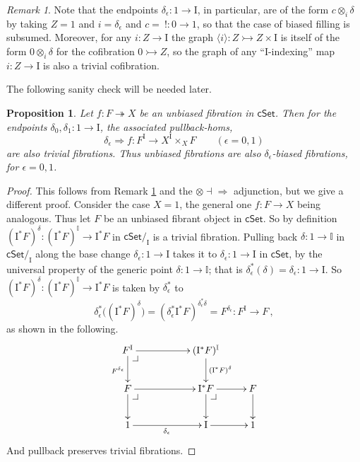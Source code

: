 \documentclass[11pt,reqno]{amsart}
\makeatletter
\newcommand{\cSet}{\ensuremath{\mathsf{cSet}}}
\newcommand{\mono}{\ensuremath{\rightarrowtail}}
\newcommand{\ra}{\ensuremath{\rightarrow}}
\newcommand{\cof}{\ensuremath{\rightarrowtail}}
\newcommand{\fib}{\ensuremath{\twoheadrightarrow}}
\renewcommand{\to}{\ensuremath{\rightarrow}}
\newcommand{\too}{\ensuremath{\longrightarrow}}
\newcommand{\gph}[1]{\ensuremath{\langle #1 \rangle}}
\newcommand{\I}{\ensuremath{\mathrm{I}}}
\newcommand{\II}{\ensuremath{\mathbb{I}}}
\newtheorem{proposition}[theorem]{Proposition}
\theoremstyle{remark}
\newtheorem{remark}[theorem]{Remark}
\theoremstyle{definition}
\newcommand{\pbcorner}[1][dr]{\save*!/#1-1.2pc/#1:(-1,1)@^{|-}\restore}
\makeatother
\begin{document}
\begin{remark}\label{rem:specialtrivcofs}
Note that the endpoints $\delta_\epsilon : 1 \ra \I$, in particular, are of the form $c \otimes_i\!\delta$ by taking $Z = 1$ and $i = \delta_\epsilon$ and $c =\ ! : 0 \ra 1$, so that the case of biased filling is subsumed.  Moreover, for any $i : Z\to \I$ the graph $\gph{i}: Z \mono Z\times \I$ is itself of the form $0 \otimes_i\!\delta$ for the cofibration $0 \cof Z$, so the graph of any ``$\I$-indexing'' map $i : Z\to\I$ is also a trivial cofibration.
\end{remark}

The following sanity check will be needed later.
\begin{proposition}\label{prop:sanitycheck}
Let $f:F\fib X$ be an unbiased fibration in $\cSet$. Then for the endpoints $\delta_0, \delta_1 : 1 \to \I$, the associated pullback-homs,
\begin{equation}\label{eq:unbiasedimpliesbiased}
\delta_\epsilon \Rightarrow f : F^\I \to X^\I \times_X F \qquad(\epsilon = 0,1)
\end{equation}
are also trivial fibrations. Thus unbiased fibrations are also $\delta_\epsilon$-biased fibrations, for $\epsilon=0,1$.
%
\end{proposition}

\begin{proof}
This follows from Remark \ref{rem:specialtrivcofs} and the ${\otimes} \dashv {\Rightarrow}$ adjunction, but we give a different proof.
Consider the case $X=1$, the general one $f:F\to X$ being analogous. Thus let $F$ be an unbiased fibrant object in $\cSet$. So by definition $(\I^*F)^\delta : (\I^*F)^\II \too \I^*F$  in $\cSet/_\I$ is a trivial fibration. 
Pulling back $\delta : 1\to \II$ in $\cSet/_\I$ along the base change $\delta_\epsilon : 1\to \I$ takes it to $\delta_\epsilon : 1\to \I$ in $\cSet$, by the universal property of the generic point $\delta : 1\to \II$; that is $\delta_\epsilon^*(\delta) = \delta_\epsilon : 1 \to \I$.  So $(\I^*F)^\delta : (\I^*F)^\II \too \I^*F$ is taken by $\delta_\epsilon^*$ to
\[
\delta_\epsilon^* \big( {(\I^*F)^\delta} \big) =
(\delta_\epsilon^*\I^*F)^{\delta_\epsilon^*\delta} =  F^{\delta_\epsilon} : F^\I \too F\,,
\]
as shown in the following.
\begin{equation}\label{diagram:unbiasedfibration1}
\xymatrix{
F^\I \ar[d]_{F^{\delta_\epsilon}} \ar[rr] \pbcorner && (\I^* F)^{\II} \ar[d]^{(\I^*F)^{\delta}} &  \\
 F \ar[d] \ar[rr] \pbcorner && \I^*F \ar[d]  \ar[r] \pbcorner & F \ar[d]  \\
 1 \ar[rr]_{\delta_\epsilon} &&  \I \ar[r] & 1
}
\end{equation}
And pullback preserves trivial fibrations. 
\end{proof}
\end{document}
